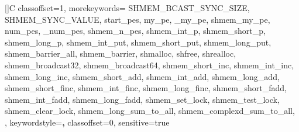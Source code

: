 \def\StandardListing {
  \lstset {
    breakatwhitespace=false,         %
    basicstyle=\ttfamily\footnotesize,
    breaklines=true,                 %
    escapeinside={\%*}{*)},          %
    extendedchars=true,              %
    keepspaces=true,                 %
    morekeywords={*,...},            %
    showspaces=false,                %
    showstringspaces=false,          %
    showtabs=false,                  %
    backgroundcolor=\color{gray}, 
  }
}

\def\ProgramNumberedListing {
  \StandardListing
  \lstset {
    numbers=left,
    numberstyle=\footnotesize
  }
}

\newcommand{\numberedlisting}[2] {
  \ProgramNumberedListing
  
  \StandardListing
}

\newcommand{\outputlisting}[2] {
\begin{minipage}{\linewidth}
\vspace{0.1in}
  
  \StandardListing
\vspace{0.1in}
\end{minipage}
}

[]{C}{
  classoffset=1,
  morekeywords={
    SHMEM_BCAST_SYNC_SIZE, SHMEM_SYNC_VALUE,
    start_pes,
    my_pe, _my_pe, shmem_my_pe,
    num_pes, _num_pes, shmem_n_pes,
    shmem_int_p, shmem_short_p, shmem_long_p,
    shmem_int_put, shmem_short_put, shmem_long_put,
    shmem_barrier_all, shmem_barrier,
    shmalloc,  shfree, shrealloc,
    shmem_broadcast32, shmem_broadcast64,
    shmem_short_inc, shmem_int_inc, shmem_long_inc,
    shmem_short_add, shmem_int_add, shmem_long_add,
    shmem_short_finc, shmem_int_finc, shmem_long_finc,
    shmem_short_fadd, shmem_int_fadd, shmem_long_fadd,
    shmem_set_lock, shmem_test_lock, shmem_clear_lock,
    shmem_long_sum_to_all,
    shmem_complexd_sum_to_all,
  },
  keywordstyle=\color{black}\textbf,
  classoffset=0,
  sensitive=true
}

